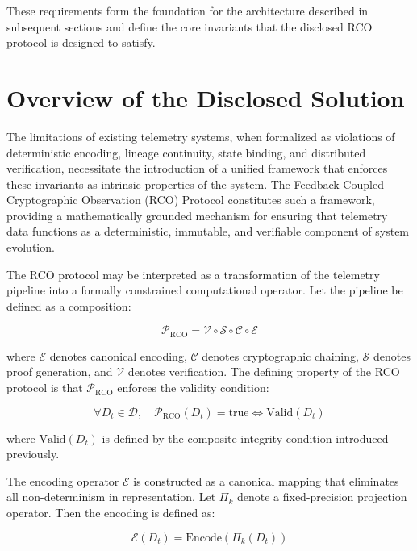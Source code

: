 These requirements form the foundation for the architecture described in subsequent sections and define the core invariants that the disclosed RCO protocol is designed to satisfy.

\section{Overview of the Disclosed Solution}

The limitations of existing telemetry systems, when formalized as violations of deterministic encoding, lineage continuity, state binding, and distributed verification, necessitate the introduction of a unified framework that enforces these invariants as intrinsic properties of the system. The Feedback-Coupled Cryptographic Observation (RCO) Protocol constitutes such a framework, providing a mathematically grounded mechanism for ensuring that telemetry data functions as a deterministic, immutable, and verifiable component of system evolution.

The RCO protocol may be interpreted as a transformation of the telemetry pipeline into a formally constrained computational operator. Let the pipeline be defined as a composition:

\begin{equation}
\mathcal{P}_{\text{RCO}} = \mathcal{V} \circ \mathcal{S} \circ \mathcal{C} \circ \mathcal{E}
\end{equation}

where $\mathcal{E}$ denotes canonical encoding, $\mathcal{C}$ denotes cryptographic chaining, $\mathcal{S}$ denotes proof generation, and $\mathcal{V}$ denotes verification. The defining property of the RCO protocol is that $\mathcal{P}_{\text{RCO}}$ enforces the validity condition:

\begin{equation}
\forall D_t \in \mathcal{D}, \quad \mathcal{P}_{\text{RCO}}(D_t) = \text{true} \iff \text{Valid}(D_t)
\end{equation}

where $\text{Valid}(D_t)$ is defined by the composite integrity condition introduced previously.

The encoding operator $\mathcal{E}$ is constructed as a canonical mapping that eliminates all non-determinism in representation. Let $\Pi_k$ denote a fixed-precision projection operator. Then the encoding is defined as:

\begin{equation}
\mathcal{E}(D_t) = \text{Encode}(\Pi_k(D_t))
\end{equation}

